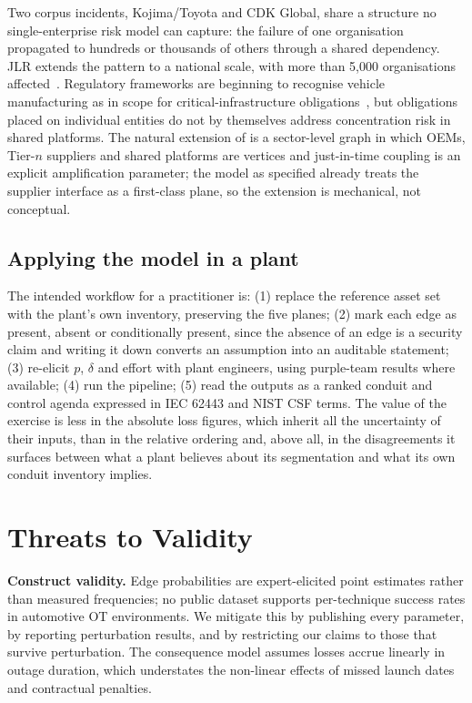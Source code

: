 Two corpus incidents, Kojima/Toyota and CDK Global, share a structure no
single-enterprise risk model can capture: the failure of one organisation
propagated to hundreds or thousands of others through a shared dependency. JLR
extends the pattern to a national scale, with more than 5,000 organisations
affected~\cite{inc18cmc,inc18cw}. Regulatory frameworks are beginning to
recognise vehicle manufacturing as in scope for critical-infrastructure
obligations~\cite{nis2directive,cisacriticalmanufacturing}, but obligations
placed on individual entities do not by themselves address concentration risk
in shared platforms. The natural extension of \capm{} is a sector-level graph
in which OEMs, Tier-$n$ suppliers and shared platforms are vertices and
just-in-time coupling is an explicit amplification parameter; the model as
specified already treats the supplier interface as a first-class plane, so the extension is mechanical, not conceptual.

\subsection{Applying the model in a plant}

The intended workflow for a practitioner is: (1) replace the reference asset
set with the plant's own inventory, preserving the five planes; (2) mark each
edge as present, absent or conditionally present, since the absence of an edge is a
security claim and writing it down converts an assumption into an auditable
statement; (3) re-elicit $p$, $\delta$ and effort with plant engineers, using
purple-team results where available; (4) run the pipeline; (5) read the outputs
as a ranked conduit and control agenda expressed in IEC 62443 and NIST CSF
terms. The value of the exercise is less in the absolute loss figures, which inherit
all the uncertainty of their inputs, than in the relative ordering
and, above all, in the disagreements it surfaces between what a plant believes
about its segmentation and what its own conduit inventory implies.

\section{Threats to Validity}
\label{sec:validity}

\textbf{Construct validity.} Edge probabilities are expert-elicited point
estimates rather than measured frequencies; no public dataset supports
per-technique success rates in automotive OT environments. We mitigate this by
publishing every parameter, by reporting perturbation results, and by
restricting our claims to those that survive perturbation. The consequence
model assumes losses accrue linearly in outage duration, which understates the
non-linear effects of missed launch dates and contractual penalties.

